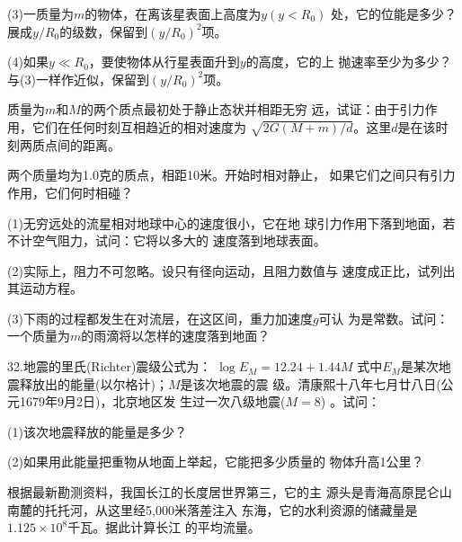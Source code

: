 \begin{exercises}
(3)一质量为$ m $的物体，在离该星表面上高度为$ y ( y < R _ { 0 } ) $
处，它的位能是多少？\lhbrak 展成$ y / R _ { 0 } $的级数，保留到$ ( y / R _ { 0 } ) ^ { 2 } $项。\rhbrak

(4)如果$ y \ll R _ { 0 } $，要使物体从行星表面升到$ y $的高度，它的上
抛速率至少为多少？\lhbrak 与(3)一样作近似，保留到$ ( y / R _ { 0 } ) ^ { 2 } $项。\rhbrak

\exercise 质量为$ m $和$ M $的两个质点最初处于静止态状并相距无穷
远，试证：由于引力作用，它们在任何时刻互相趋近的相对速度为
$ \sqrt { 2 G ( M + m ) / d } $。这里$ d $是在该时刻两质点间的距离。

\exercise 两个质量均为1.0克的质点，相距10米。开始时相对静止，
如果它们之间只有引力作用，它们何时相碰？

\exercise (1)无穷远处的流星相对地球中心的速度很小，它在地
球引力作用下落到地面，若不计空气阻力，试问：它将以多大的
速度落到地球表面。

(2)实际上，阻力不可忽略。设只有径向运动，且阻力数值与
速度成正比，试列出其运动方程。

(3)下雨的过程都发生在对流层，在这区间，重力加速度$ g $可认
为是常数。试问：一个质量为$ m $的雨滴将以怎样的速度落到地面？

32.地震的里氏(Richter)震级公式为：
$ \log E _ { M } = 12.24 + 1.44 M $
式中$ E _ { M } $是某次地震释放出的能量(以尔格计)；$ M $是该次地震的震
级。清康熙十八年七月廿八日(公元1679年9月2日)，北京地区发
生过一次八级地震($ M = 8 $) 。试问：

(1)该次地震释放的能量是多少？

(2)如果用此能量把重物从地面上举起，它能把多少质量的
物体升高1公里？

\exercise 根据最新勘测资料，我国长江的长度居世界第三，它的主
源头是青海高原昆仑山南麓的托托河，从这里经5,000米落差注入
东海，它的水利资源的储藏量是$ 1.125 \times 10 ^ { 8 } $千瓦。据此计算长江
的平均流量。

\end{exercises}